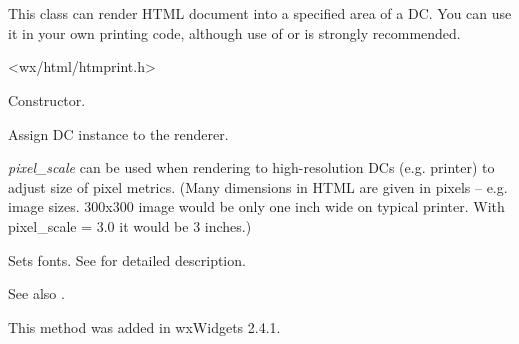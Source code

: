 %
%

\section{}\label{wxhtmldcrenderer}

This class can render HTML document into a specified area of a DC. You can use it
in your own printing code, although use of  
or  is strongly recommended.




<wx/html/htmprint.h>


\label{wxhtmldcrendererwxhtmldcrenderer}


Constructor.

\label{wxhtmldcrenderersetdc}


Assign DC instance to the renderer.

{\it pixel\_scale} can be used when rendering to high-resolution DCs (e.g. printer) to adjust size of pixel metrics.
(Many dimensions in HTML are given in pixels -- e.g. image sizes. 300x300 image would be only one
inch wide on typical printer. With pixel\_scale = 3.0 it would be 3 inches.)

\label{wxhtmldcrenderersetfonts}


Sets fonts. See  for
detailed description.

See also .


This method was added in wxWidgets 2.4.1.

\label{wxhtmldcrenderersetsize}

